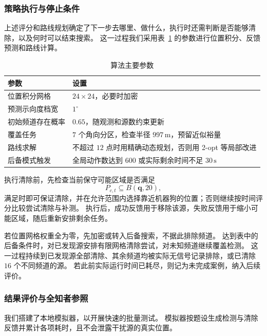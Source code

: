 \documentclass[UTF8,a4paper,12pt]{ctexart}
\begin{document}
\subsubsection{策略执行与停止条件}

上述评分和路线规划确定了下一步去哪里、做什么，执行时还需判断是否能够清除，以及何时可以结束搜索。
这一过程我们采用表~\ref{tab:q3-parameters} 的参数进行位置积分、反馈预测和路线计算。

\begin{table}[htbp]
  \centering
  \caption{算法主要参数}
  \label{tab:q3-parameters}
  \small
  \begin{tabularx}{0.96\linewidth}{lX}
    \toprule
    参数 & 设置 \\
    \midrule
    位置积分网格 & $24\times24$，必要时加密 \\
    预测示向度档宽 & $1^\circ$ \\
    初始频道存在概率 & $0.65$，随观测和源数约束更新 \\
    覆盖任务 & $7$ 个角向分区，检查半径 $997\,\mathrm m$，预留近似裕量 \\
    路线求解 & 不超过 $12$ 点时用精确动态规划\cite{held1962dynamic}，否则用 2-opt 等局部改进\cite{croes1958method} \\
    后备模式触发 & 全局动作数达到 $600$ 或实际剩余时间不足 $30\,\mathrm s$ \\
    \bottomrule
  \end{tabularx}
\end{table}

执行清除前，先检查当前保守可能区域是否满足
\begin{equation}
  P_{c,t}\subseteq B(\boldsymbol q,20),
  \label{eq:q3-safe-clear}
\end{equation}
满足时即可保证清除，并在允许范围内选择靠近机器狗的位置；否则继续按时间评分比较尝试清除与补测。
执行后，成功反馈用于移除该源，失败反馈用于缩小可能区域，随后重新安排剩余任务。

若位置网格权重全为零，先加密或转入后备搜索，不据此排除频道。
达到表中的后备条件时，对已发现源安排有限网格清除尝试，对未知频道继续覆盖检测。
这一过程持续到已发现源全部清除、其余频道均被实际无信号记录排除，或已清除 $16$ 个不同频道的源。
若此前实际运行时间已耗尽，则记为未完成案例，纳入后续评价。

\subsubsection{结果评价与全知者参照}

我们搭建了本地模拟器，以开展快速的批量测试。
模拟器按题设生成检测与清除反馈并累计各项耗时，且不会泄露干扰源的真实位置。
\end{document}

